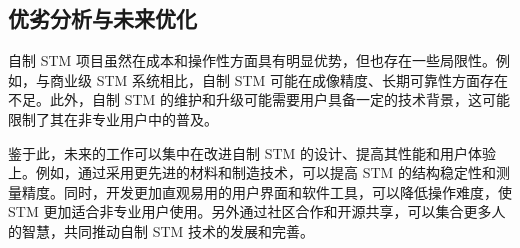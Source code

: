 \documentclass{article}
\begin{document}
\subsection{优劣分析与未来优化}
自制 STM 项目虽然在成本和操作性方面具有明显优势，但也存在一些局限性。例如，与商业级 STM 系统相比，自制 STM 可能在成像精度、长期可靠性方面存在不足。此外，自制 STM 的维护和升级可能需要用户具备一定的技术背景，这可能限制了其在非专业用户中的普及。

鉴于此，未来的工作可以集中在改进自制 STM 的设计、提高其性能和用户体验上。例如，通过采用更先进的材料和制造技术，可以提高 STM 的结构稳定性和测量精度。同时，开发更加直观易用的用户界面和软件工具，可以降低操作难度，使 STM 更加适合非专业用户使用。另外通过社区合作和开源共享，可以集合更多人的智慧，共同推动自制 STM 技术的发展和完善。


\newpage
{}
\end{document}
